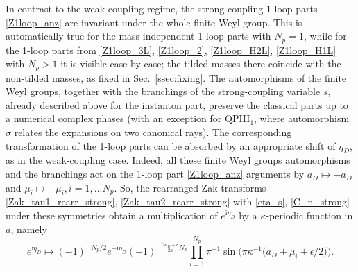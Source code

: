 \documentclass[12pt,a4paper]{article}
\numberwithin{equation}{section}
\newcommand{\ri}{\mathrm{i}}
\newcommand{\D}{\scriptscriptstyle{D}}
\begin{document}
In contrast to the weak-coupling regime, the strong-coupling 1-loop parts \eqref{Z1loop_anz} are invariant under the whole finite Weyl group. This is automatically true for the mass-independent 1-loop parts with $N_p=1$, while for the 1-loop parts from \eqref{Z1loop_3L}, \eqref{Z1loop_2}, \eqref{Z1loop_H2L}, \eqref{Z1loop_H1L} with $N_p>1$ it is visible case by case; the tilded masses there coincide with the non-tilded masses, as fixed in Sec.~\ref{ssec:fixing}. The automorphisms of the finite Weyl groups, together with the branchings of the strong-coupling variable $s$, already described above for the instanton part, preserve the classical parts up to a numerical complex phases (with an exception for QPIII$_1$, where automorphism $\sigma$ relates the expansions on two canonical rays). The corresponding transformation of the 1-loop parts can be absorbed by an appropriate shift of $\eta_{\D}$, as in the weak-coupling case. Indeed, all these finite Weyl groups automorphisms and the branchings act on the 1-loop part \eqref{Z1loop_anz} arguments by $a_{\D}\mapsto-a_{\D}$ and $\mu_i\mapsto-\mu_i, {\scriptstyle i=1,\ldots N_p}$. So, the rearranged Zak transforms \eqref{Zak_tau1_rearr_strong}, \eqref{Zak_tau2_rearr_strong} with \eqref{eta_s}, \eqref{C_n_strong} under these symmetries obtain a multiplication of $e^{\ri\eta_{\D}}$ by a $\kappa$-periodic function in $a$, namely
\begin{equation}\label{eta_D_periodic_factor}
e^{\ri\eta_{\D}}\mapsto (-1)^{-N_p/2}e^{-\ri\eta_{\D}}(-1)^{-\frac{2a_{\D}{+}\epsilon}{2\kappa}N_p}\prod_{i=1}^{N_p}\pi^{-1}\sin\Big(\pi\kappa^{-1}\big(a_{\D}+\mu_i+\epsilon/2\big)\Big).
\end{equation}
\end{document}
